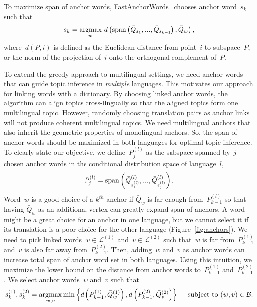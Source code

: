To maximize span of anchor words, FastAnchorWords~\cite{arora-2013} chooses anchor word~$s_k$ such that
\begin{equation}
  s_k = \operatorname*{\arg\!\max}_{w} \, d\left(\text{span} \left( { \bar{Q} }_{s_1}, ..., { \bar{Q} }_{s_{k-1}}\right ), \bar{Q}_{w}\right), 
\end{equation}
where~$d(P,i)$ is defined as the Euclidean distance from point~$i$ to subspace~$P$, or the norm of the projection of~$i$ onto the orthogonal complement of~$P$.

To extend the greedy approach to multilingual settings, we need anchor words that can guide topic inference in \emph{multiple} languages.  This motivates our approach for linking words with a dictionary.  By choosing linked anchor words, the algorithm can align topics cross-lingually so that the aligned topics form one multilingual topic.  However, randomly choosing translation pairs as anchor links will not produce coherent multilingual topics.  We need multilingual anchors that also inherit the geometric properties of monolingual anchors.  So, the span of anchor words should be maximized in both languages for optimal topic inference.  To clearly state our objective, we define~$P_j^{(l)}$ as the subspace spanned by~$j$ chosen anchor words in the conditional
distribution space of language~$l$,  
\begin{equation}
  P_j^{(l)} = \text{span} \left( {\bar{Q}^{(l)}}_{s_1^{(l)} }, ..., {\bar{Q}^{(l)}}_{s_{j}^{(l)}}\right ).
\end{equation}
Word~$w$ is a good choice of a $k^{th}$ anchor if $\bar{Q}_w$ is far enough from~$P_{k-1}^{(l)}$ so that having $\bar{Q}_w$ as an additional vertex can greatly expand span of anchors. A word might be a great choice for an anchor in one language, but we cannot select it if its translation is a poor choice for the other language (Figure~\ref{fig:anchors}). We need to pick linked words~$w \in \mathcal{L}^{(1)}$ and~$v \in \mathcal{L}^{(2)}$ such
that~$w$ is far from~$P_{k-1}^{(1)}$ and~$v$ is also far away
from~$P_{k-1}^{(2)}$.  Then, adding~$w$ and~$v$ as anchor words can increase total span of anchor word set in both languages.  Using this intuition, we maximize the lower bound on the distance from anchor words to~$P_{k-1}^{(1)}$ and~$P_{k-1}^{(2)}$.  We select anchor words~$w$ and~$v$ such that
  \begin{equation}
    \label{eq:multi_anchors}
    s_k^{(1)}, s_k^{(2)} = 
      \operatorname*{\arg\!\max}_{w, v} 
      \min \left\{ 
        d\left( P_{k-1}^{(1)}, \bar{Q}^{(1)}_{w}\right), d\left(P_{k-1}^{(2)}, \bar{Q}^{(2)}_{v} \right) 
      \right\} 
      \quad \mbox{ subject to } (w, v) \in \mathcal{B}.
  \end{equation}

